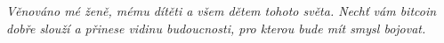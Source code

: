 
\newpage \vspace*{8cm}
\thispagestyle{empty}
\begin{center}
  \Large \emph{
  Věnováno mé ženě, mému dítěti a všem dětem tohoto světa. Nechť vám bitcoin dobře slouží 
  a přinese vidinu budoucnosti, pro kterou bude mít smysl bojovat.
  }
\end{center}
